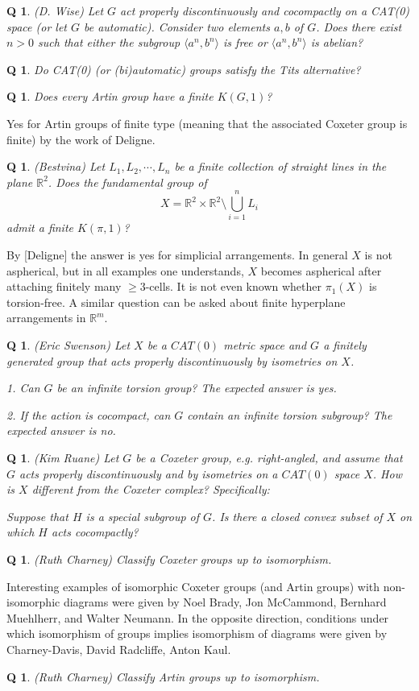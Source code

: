 \documentclass[11pt]{article}
\newtheorem{q}[thm]{Q}
\theoremstyle{remark}
\def\b{\begin{q}}
\def\e{\end{q}}
\def\R{{\mathbb R}}
\newcommand{\<}{\langle}
\renewcommand{\>}{\rangle}
\begin{document}
\b
(D. Wise) Let $G$ act properly discontinuously 
and cocompactly on a CAT(0) space
(or let $G$ be automatic).
Consider two elements $a,b$ of $G$.
Does there exist $n>0$ such that 
either the subgroup
$\langle a^n,b^n\rangle$ is free
or
$\langle a^n,b^n\rangle$ is abelian?\e

\b
Do CAT(0) (or (bi)automatic) groups satisfy the Tits
alternative?\e

\b Does every Artin group have a finite $K(G,1)$? \e
Yes for Artin
groups of finite type (meaning that the associated Coxeter group is
finite) by the work of Deligne.   

\b (Bestvina)
Let $L_1,L_2,\cdots,L_n$ be a finite collection of straight lines in the
plane $\R^2$. Does the fundamental group of $$X=\R^2\times\R^2\setminus
\bigcup_{i=1}^n L_i$$ admit a finite $K(\pi,1)$?\e

By [Deligne] the answer is yes for simplicial arrangements. In general $X$ is
not aspherical, but in all examples one understands, $X$ becomes aspherical
after attaching finitely many $\geq 3$-cells. It is not even known whether
$\pi_1(X)$ is torsion-free. A similar question can be asked about
finite hyperplane arrangements in $\R^m$.

\b
(Eric Swenson)
Let $X$ be a $CAT(0)$ metric space and $G$ a finitely generated group that
acts properly discontinuously by isometries on $X$.

1. Can $G$ be an infinite torsion group? The expected answer is yes.

2. If the action is cocompact, can $G$ contain an infinite torsion subgroup?
   The expected answer is no.
\e

\b
(Kim Ruane)
Let $G$ be a Coxeter group, e.g. right-angled,  and assume that $G$ acts
properly discontinuously and by isometries on a $CAT(0)$ space $X$. How is $X$
different from the Coxeter complex? Specifically:

Suppose that $H$ is a special subgroup of $G$. Is there a closed convex
subset of $X$ on which $H$ acts cocompactly?\e


\b (Ruth Charney) Classify Coxeter groups up to isomorphism. \e
Interesting examples of isomorphic Coxeter groups (and Artin groups)
with non-isomorphic diagrams were given by Noel Brady, Jon McCammond,
Bernhard Muehlherr, and Walter Neumann. In
the opposite direction, conditions under which isomorphism of groups
implies isomorphism of diagrams were given by Charney-Davis, David
Radcliffe, Anton Kaul.  \b (Ruth Charney) Classify Artin groups up to
isomorphism. \e
\end{document}
